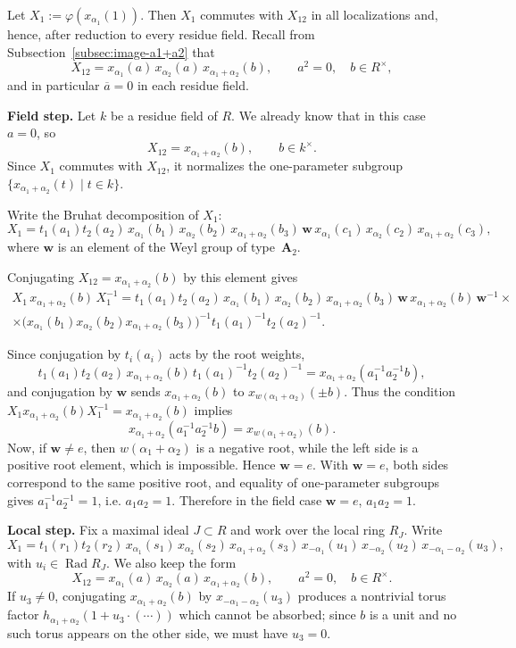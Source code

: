 \documentclass[]{jgcc}
\DeclareMathOperator{\Rad}{Rad}
\numberwithin{equation}{section}
\begin{document}
Let $X_1:=\varphi(x_{\alpha_1}(1))$. Then $X_1$ commutes with $X_{12}$ in all localizations and, hence, after reduction to every residue field.
Recall from Subsection~\ref{subsec:image-a1+a2} that
\[
X_{12}=x_{\alpha_1}(a)\,x_{\alpha_2}(a)\,x_{\alpha_1+\alpha_2}(b),\qquad a^2=0,\quad b\in R^\times,
\]
and in particular $\overline a=0$ in each residue field.

\medskip
\noindent\textbf{Field step.}
Let $k$ be a residue field of $R$.
We already know that in this case $a=0$, so
\[
X_{12}=x_{\alpha_1+\alpha_2}(b),\qquad b\in k^\times.
\]
Since $X_1$ commutes with $X_{12}$, it normalizes the one-parameter subgroup
$\{x_{\alpha_1+\alpha_2}(t)\mid t\in k\}$.

Write the Bruhat decomposition of $X_1$:
\[
X_1=t_1(a_1)t_2(a_2)\,x_{\alpha_1}(b_1)\,x_{\alpha_2}(b_2)\,
x_{\alpha_1+\alpha_2}(b_3)\,\mathbf w\,
x_{\alpha_1}(c_1)\,x_{\alpha_2}(c_2)\,x_{\alpha_1+\alpha_2}(c_3),
\]
where $\mathbf w$ is an element of the Weyl group of type~$\mathbf A_2$.

Conjugating $X_{12}=x_{\alpha_1+\alpha_2}(b)$ by this element gives
\begin{multline*}
X_1\,x_{\alpha_1+\alpha_2}(b)\,X_1^{-1}
=t_1(a_1)t_2(a_2)\,x_{\alpha_1}(b_1)\,x_{\alpha_2}(b_2)\,
x_{\alpha_1+\alpha_2}(b_3)\,\mathbf w\,
x_{\alpha_1+\alpha_2}(b)\,\mathbf w^{-1}\times \\
\times
\bigl(x_{\alpha_1}(b_1)x_{\alpha_2}(b_2)x_{\alpha_1+\alpha_2}(b_3)\bigr)^{-1}
t_1(a_1)^{-1}t_2(a_2)^{-1}.
\end{multline*}

Since conjugation by $t_i(a_i)$ acts by the root weights,
\[
t_1(a_1)t_2(a_2)\,x_{\alpha_1+\alpha_2}(b)\,t_1(a_1)^{-1}t_2(a_2)^{-1}
= x_{\alpha_1+\alpha_2}(a_1^{-1}a_2^{-1}b),
\]
and conjugation by $\mathbf w$ sends $x_{\alpha_1+\alpha_2}(b)$ to
$x_{w(\alpha_1+\alpha_2)}(\pm b)$.
Thus the condition $X_1x_{\alpha_1+\alpha_2}(b)X_1^{-1}=x_{\alpha_1+\alpha_2}(b)$
implies
\[
x_{\alpha_1+\alpha_2}(a_1^{-1}a_2^{-1}b)
= x_{w(\alpha_1+\alpha_2)}(b).
\]
Now, if $\mathbf w\neq e$, then $w(\alpha_1+\alpha_2)$ is a negative root,
while the left side is a positive root element, which is impossible.
Hence $\mathbf w=e$.
With $\mathbf w=e$, both sides correspond to the same positive root, and
equality of one-parameter subgroups gives $a_1^{-1}a_2^{-1}=1$,
i.e. $a_1a_2=1$.
Therefore in the field case $\mathbf w=e$, $a_1a_2=1$.

\medskip
\noindent\textbf{Local step.}
Fix a maximal ideal $J\subset R$ and work over the local ring $R_J$.
Write
\[
X_1=t_1(r_1)t_2(r_2)\,x_{\alpha_1}(s_1)\,x_{\alpha_2}(s_2)\,x_{\alpha_1+\alpha_2}(s_3)\,
x_{-\alpha_1}(u_1)\,x_{-\alpha_2}(u_2)\,x_{-\alpha_1-\alpha_2}(u_3),
\]
with $u_i\in \Rad R_J$.
We also keep the form
\[
X_{12}=x_{\alpha_1}(a)\,x_{\alpha_2}(a)\,x_{\alpha_1+\alpha_2}(b),\qquad a^2=0,\quad b\in R^\times.
\]
If $u_3\neq0$, conjugating $x_{\alpha_1+\alpha_2}(b)$ by $x_{-\alpha_1-\alpha_2}(u_3)$ produces a nontrivial torus factor
$h_{\alpha_1+\alpha_2}(1+u_3\cdot(\cdots))$ which cannot be absorbed; since $b$ is a unit and no such torus appears on the other side, we must have $u_3=0$.
\end{document}
